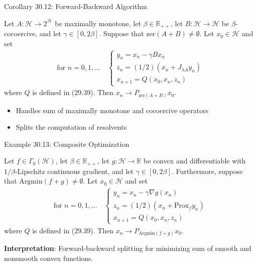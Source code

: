 \documentclass[aspectratio=169,10pt]{beamer}
\begin{document}
\begin{frame}{Corollary 30.12: Forward-Backward Algorithm}
  \begin{corollary}
    Let $A: \mathcal{H} \to 2^{\mathcal{H}}$ be maximally monotone, let $\beta \in \mathbb{R}_{++}$, let $B: \mathcal{H} \to \mathcal{H}$ be $\beta$-cocoercive, and let $\gamma \in [0, 2\beta]$. Suppose that $\text{zer}(A + B) \neq \emptyset$. Let $x_0 \in \mathcal{H}$ and set
    \begin{align}
      \text{for } n = 0, 1, \ldots \quad
      \begin{cases}
        y_n = x_n - \gamma B x_n \\
        z_n = (1/2)(x_n + J_{\lambda A} y_n) \\
        x_{n+1} = Q(x_0, x_n, z_n)
      \end{cases}
    \end{align}
    where $Q$ is defined in (29.39). Then $x_n \to P_{\text{zer}(A+B)} x_0$.
  \end{corollary}

  \vspace{0.3cm}

  \begin{itemize}
    \item Handles sum of maximally monotone and cocoercive operators
    \item Splits the computation of resolvents
  \end{itemize}
\end{frame}


\begin{frame}{Example 30.13: Composite Optimization}
  \begin{example}
    Let $f \in \Gamma_0(\mathcal{H})$, let $\beta \in \mathbb{R}_{++}$, let $g: \mathcal{H} \to \mathbb{R}$ be convex and differentiable with $1/\beta$-Lipschitz continuous gradient, and let $\gamma \in [0, 2\beta]$. Furthermore, suppose that $\text{Argmin}(f + g) \neq \emptyset$. Let $x_0 \in \mathcal{H}$ and set
    \begin{align}
      \text{for } n = 0, 1, \ldots \quad
      \begin{cases}
        y_n = x_n - \gamma \nabla g(x_n) \\
        z_n = (1/2)(x_n + \text{Prox}_{f} y_n) \\
        x_{n+1} = Q(x_0, x_n, z_n)
      \end{cases}
    \end{align}
    where $Q$ is defined in (29.39). Then $x_n \to P_{\text{Argmin}(f+g)} x_0$.
  \end{example}

  \vspace{0.3cm}

  \textbf{Interpretation}: Forward-backward splitting for minimizing sum of smooth and nonsmooth convex functions.
\end{frame}
\end{document}
